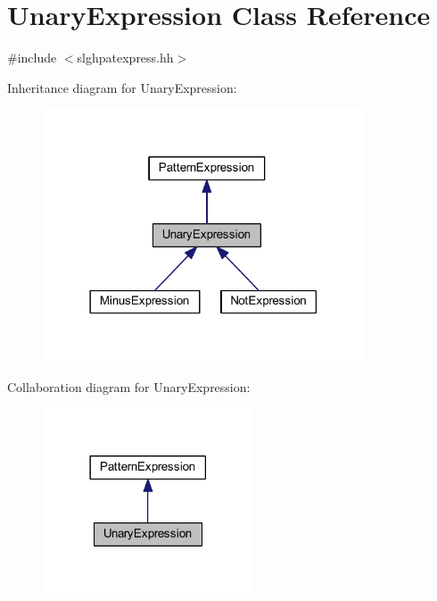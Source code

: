 \hypertarget{class_unary_expression}{}\section{Unary\+Expression Class Reference}
\label{class_unary_expression}


{\ttfamily \#include $<$slghpatexpress.\+hh$>$}



Inheritance diagram for Unary\+Expression\+:
\nopagebreak
\begin{figure}[H]
\begin{center}
\leavevmode
\includegraphics[width=270pt]{class_unary_expression__inherit__graph}
\end{center}
\end{figure}


Collaboration diagram for Unary\+Expression\+:
\nopagebreak
\begin{figure}[H]
\begin{center}
\leavevmode
\includegraphics[width=177pt]{class_unary_expression__coll__graph}
\end{center}
\end{figure}
